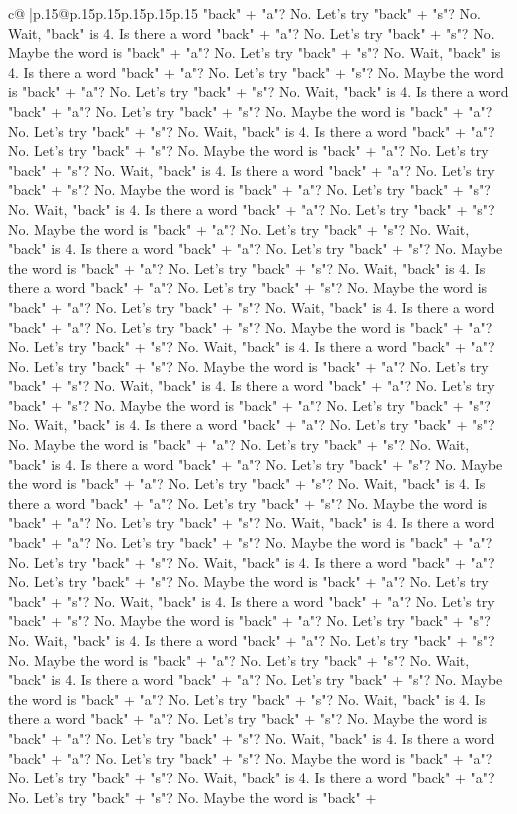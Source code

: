 \documentclass{article}
\begin{document}
{\begin{supertabular}{c@{$\;$}|p{.15\linewidth}@{}p{.15\linewidth}p{.15\linewidth}p{.15\linewidth}p{.15\linewidth}p{.15\linewidth}}
{{{"back" + "a"? No. Let's try "back" + "s"? No. Wait, "back" is 4. Is there a word "back" + "a"? No. Let's try "back" + "s"? No. Maybe the word is "back" + "a"? No. Let's try "back" + "s"? No. Wait, "back" is 4. Is there a word "back" + "a"? No. Let's try "back" + "s"? No. Maybe the word is "back" + "a"? No. Let's try "back" + "s"? No. Wait, "back" is 4. Is there a word "back" + "a"? No. Let's try "back" + "s"? No. Maybe the word is "back" + "a"? No. Let's try "back" + "s"? No. Wait, "back" is 4. Is there a word "back" + "a"? No. Let's try "back" + "s"? No. Maybe the word is "back" + "a"? No. Let's try "back" + "s"? No. Wait, "back" is 4. Is there a word "back" + "a"? No. Let's try "back" + "s"? No. Maybe the word is "back" + "a"? No. Let's try "back" + "s"? No. Wait, "back" is 4. Is there a word "back" + "a"? No. Let's try "back" + "s"? No. Maybe the word is "back" + "a"? No. Let's try "back" + "s"? No. Wait, "back" is 4. Is there a word "back" + "a"? No. Let's try "back" + "s"? No. Maybe the word is "back" + "a"? No. Let's try "back" + "s"? No. Wait, "back" is 4. Is there a word "back" + "a"? No. Let's try "back" + "s"? No. Maybe the word is "back" + "a"? No. Let's try "back" + "s"? No. Wait, "back" is 4. Is there a word "back" + "a"? No. Let's try "back" + "s"? No. Maybe the word is "back" + "a"? No. Let's try "back" + "s"? No. Wait, "back" is 4. Is there a word "back" + "a"? No. Let's try "back" + "s"? No. Maybe the word is "back" + "a"? No. Let's try "back" + "s"? No. Wait, "back" is 4. Is there a word "back" + "a"? No. Let's try "back" + "s"? No. Maybe the word is "back" + "a"? No. Let's try "back" + "s"? No. Wait, "back" is 4. Is there a word "back" + "a"? No. Let's try "back" + "s"? No. Maybe the word is "back" + "a"? No. Let's try "back" + "s"? No. Wait, "back" is 4. Is there a word "back" + "a"? No. Let's try "back" + "s"? No. Maybe the word is "back" + "a"? No. Let's try "back" + "s"? No. Wait, "back" is 4. Is there a word "back" + "a"? No. Let's try "back" + "s"? No. Maybe the word is "back" + "a"? No. Let's try "back" + "s"? No. Wait, "back" is 4. Is there a word "back" + "a"? No. Let's try "back" + "s"? No. Maybe the word is "back" + "a"? No. Let's try "back" + "s"? No. Wait, "back" is 4. Is there a word "back" + "a"? No. Let's try "back" + "s"? No. Maybe the word is "back" + "a"? No. Let's try "back" + "s"? No. Wait, "back" is 4. Is there a word "back" + "a"? No. Let's try "back" + "s"? No. Maybe the word is "back" + "a"? No. Let's try "back" + "s"? No. Wait, "back" is 4. Is there a word "back" + "a"? No. Let's try "back" + "s"? No. Maybe the word is "back" + "a"? No. Let's try "back" + "s"? No. Wait, "back" is 4. Is there a word "back" + "a"? No. Let's try "back" + "s"? No. Maybe the word is "back" + "a"? No. Let's try "back" + "s"? No. Wait, "back" is 4. Is there a word "back" + "a"? No. Let's try "back" + "s"? No. Maybe the word is "back" + "a"? No. Let's try "back" + "s"? No. Wait, "back" is 4. Is there a word "back" + "a"? No. Let's try "back" + "s"? No. Maybe the word is "back" + "a"? No. Let's try "back" + "s"? No. Wait, "back" is 4. Is there a word "back" + "a"? No. Let's try "back" + "s"? No. Maybe the word is "back" + }}}
\end{supertabular}}
\end{document}
